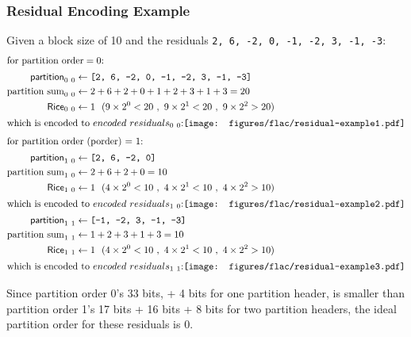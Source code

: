 \subsubsection{Residual Encoding Example}
Given a block size of 10 and the residuals \texttt{2, 6, -2, 0, -1, -2, 3, -1, -3}:
\begin{align*}
\intertext{for $\text{partition order} = 0$:}
\textsf{partition}_{0~0} &\leftarrow \texttt{[2, 6, -2, 0, -1, -2, 3, -1, -3]} \\
\text{partition sum}_{0~0} &\leftarrow 2 + 6 + 2 + 0 + 1 + 2 + 3 + 1 + 3 = 20 \\
\textsf{Rice}_{0~0} &\leftarrow 1~~(9 \times 2 ^ 0 < 20~,~9 \times 2 ^ 1 < 20~,~9 \times 2 ^ 2 > 20) \\
\intertext{which is encoded to $encoded~residuals_{0~0}$:
\newline
\texttt{[image: figures/flac/residual-example1.pdf]}}
\intertext{for partition order (porder) = 1:}
\textsf{partition}_{1~0} &\leftarrow \texttt{[2, 6, -2, 0]} \\
\text{partition sum}_{1~0} &\leftarrow 2 + 6 + 2 + 0 = 10 \\
\textsf{Rice}_{1~0} &\leftarrow 1~~(4 \times 2 ^ 0 < 10~,~4 \times 2 ^ 1 < 10~,~4 \times 2 ^ 2 > 10) \\
\intertext{which is encoded to $encoded~residuals_{1~0}$:
\newline
\texttt{[image: figures/flac/residual-example2.pdf]}}
\textsf{partition}_{1~1} &\leftarrow \texttt{[-1, -2, 3, -1, -3]} \\
\text{partition sum}_{1~1} &\leftarrow 1 + 2 + 3 + 1 + 3 = 10 \\
\textsf{Rice}_{1~1} &\leftarrow 1~~(4 \times 2 ^ 0 < 10~,~4 \times 2 ^ 1 < 10~,~4 \times 2 ^ 2 > 10) \\
\intertext{which is encoded to $encoded~residuals_{1~1}$:
\newline
\texttt{[image: figures/flac/residual-example3.pdf]}}
\end{align*}
\par
\noindent
Since partition order 0's 33 bits, + 4 bits for one partition header,
is smaller than partition order 1's 17 bits + 16 bits + 8 bits
for two partition headers, the ideal partition order for these residuals is 0.

\clearpage

